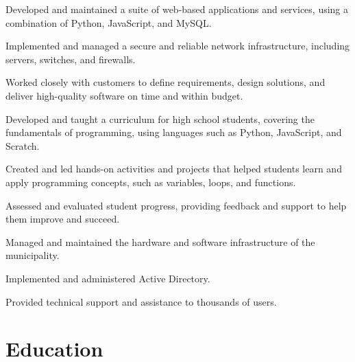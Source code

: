 \documentclass[]{deedy-resume-openfont}
\begin{document}
\begin{tightemize}
\item Developed and maintained a suite of web-based applications and services, using a combination of Python, JavaScript, and MySQL.
\item Implemented and managed a secure and reliable network infrastructure, including servers, switches, and firewalls.
\item Worked closely with customers to define requirements, design solutions, and deliver high-quality software on time and within budget.
\end{tightemize}
\sectionsep

\begin{tightemize}
\item Developed and taught a curriculum for high school students, covering the fundamentals of programming, using languages such as Python, JavaScript, and Scratch.
\item Created and led hands-on activities and projects that helped students learn and apply programming concepts, such as variables, loops, and functions.
\item Assessed and evaluated student progress, providing feedback and support to help them improve and succeed.
\end{tightemize}
\sectionsep

\begin{tightemize}
\item Managed and maintained the hardware and software infrastructure of the municipality.
\item Implemented and administered Active Directory.
\item Provided technical support and assistance to thousands of users.
\end{tightemize}
\sectionsep

\section{Education}
\sectionsep
\end{document}
